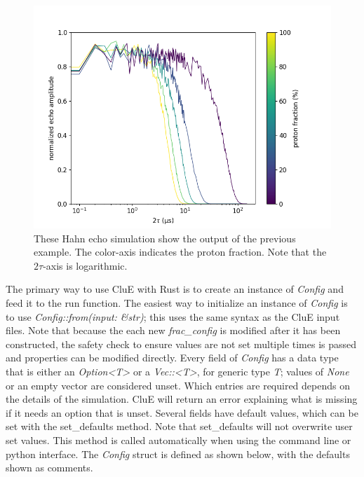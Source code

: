 \documentclass{book}
\begin{document}
\begin{figure} [H]
	\centering
	\includegraphics[width=0.75\linewidth]{figs/fig_CluE-proton_fractions.png}
  \caption{These Hahn echo simulation show the output of the previous example.
  The color-axis indicates the proton fraction.
  Note that the $2\tau$-axis is logarithmic.
  }
  \label{fig:rust_out}
\end{figure}
%
The primary way to use CluE with Rust is to create an instance of 
\textit{Config} and feed it to the run function.
The easiest way to initialize an instance of \textit{Config} is to use 
\textit{Config::from(input: \&str)}; this uses the same syntax as the CluE
input files. 
Note that because the each new \textit{frac\_config} is modified after it
has been constructed, the safety check to ensure values are not set multiple 
times is passed and properties can be modified directly.
Every field of \textit{Config} has a data type that is either an 
\textit{Option<T>} or a \textit{Vec::<T>}, for generic type \textit{T}; 
values of \textit{None} or an empty vector are considered unset.
Which entries are required depends on the details of the simulation.
CluE will return an error explaining what is missing if it needs an option that
is unset.  Several fields have default values, which can be set with the
set\_defaults method.  
Note that set\_defaults will not overwrite user set values.  
This method is called automatically when using the command line or python
interface.
The \textit{Config} struct is defined as shown below, with the defaults shown 
as comments.    
\end{document}

